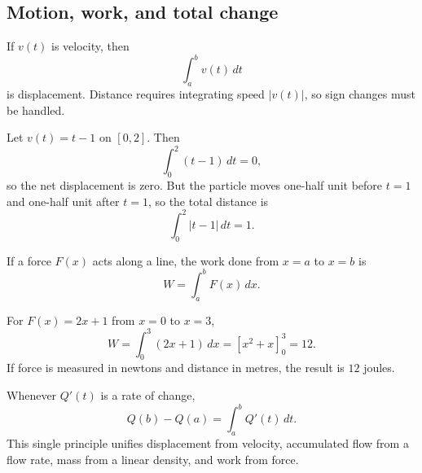 \subsection{Motion, work, and total change}

If \(v(t)\) is velocity, then
\[
\int_a^b v(t)\,dt
\]
is displacement. Distance requires integrating speed \(|v(t)|\), so sign changes must be handled.

\begin{examplebox}
Let \(v(t)=t-1\) on \([0,2]\). Then
\[
\int_0^2 (t-1)\,dt=0,
\]
so the net displacement is zero. But the particle moves one-half unit before \(t=1\) and one-half unit after \(t=1\), so the total distance is
\[
\int_0^2 |t-1|\,dt=1.
\]
\end{examplebox}

If a force \(F(x)\) acts along a line, the work done from \(x=a\) to \(x=b\) is
\[
W=\int_a^b F(x)\,dx.
\]

\begin{examplebox}
For \(F(x)=2x+1\) from \(x=0\) to \(x=3\),
\[
W=\int_0^3(2x+1)\,dx
=\left[x^2+x\right]_0^3=12.
\]
If force is measured in newtons and distance in metres, the result is \(12\) joules.
\end{examplebox}

\begin{corebox}
Whenever \(Q'(t)\) is a rate of change,
\[
Q(b)-Q(a)=\int_a^b Q'(t)\,dt.
\]
This single principle unifies displacement from velocity, accumulated flow from a flow rate, mass from a linear density, and work from force.
\end{corebox}
